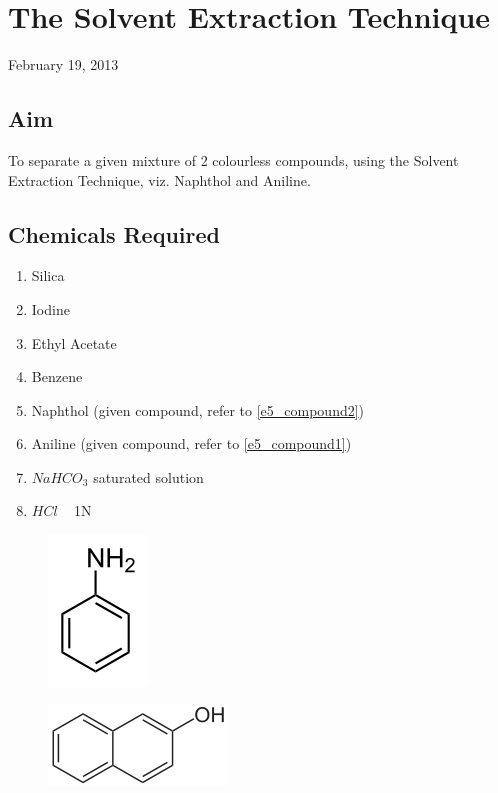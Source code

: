 \chapter{The Solvent Extraction Technique}\label{solventExtraction}
\begin{flushright}
February 19, 2013
\end{flushright}
\section{Aim}
To separate a given mixture of 2 colourless compounds, using the Solvent Extraction Technique, viz. Naphthol and Aniline.

\section {Chemicals Required}
	\begin{enumerate}
		\item Silica
		\item Iodine
		\item Ethyl Acetate
		\item Benzene
		\item Naphthol (given compound, refer to \autoref{e5_compound2})
		\item Aniline (given compound, refer to \autoref{e5_compound1})
		\item $NaHCO_3$ saturated solution
		\item $HCl$ ~ 1N
	\end{enumerate}

	\begin{figure}[bth]
		\begin{center}
			\includegraphics[width=0.2\linewidth]{gfx/e5_compound1}
		\end{center}
	\caption[Aniline]{\label{e5_compound1}}
	\end{figure}

	\begin{figure}[bth]
		\begin{center}
			\includegraphics[width=0.4\linewidth]{gfx/e5_compound2}
		\end{center}
	\caption[2-Naphthol]{\label{e5_compound2}}
	\end{figure}

